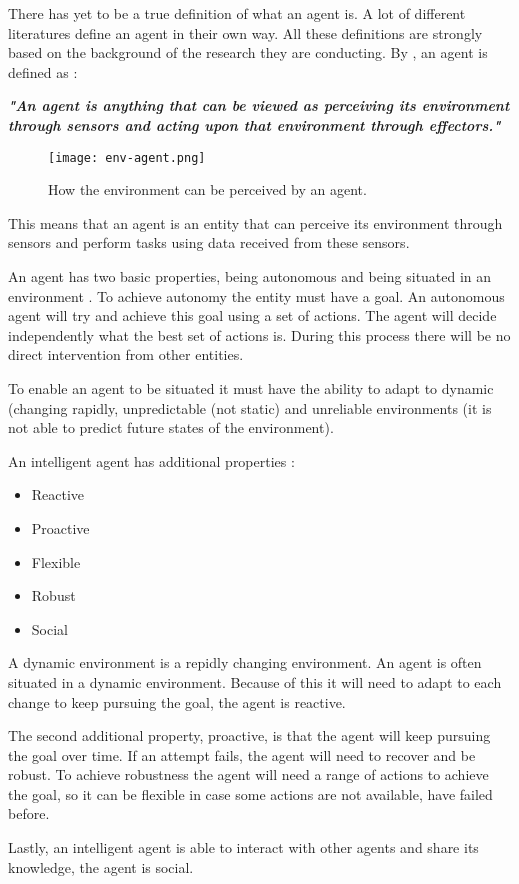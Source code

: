 
There has yet to be a true definition of what an agent is. A lot of different literatures define an agent in their own way.
All these definitions are strongly based on the background of the research they are conducting. By \citet{AI:agent}, an agent is defined as :

\begin{center}
    \textit{\textbf{"An agent is anything that can be viewed as perceiving its environment through sensors and acting upon that environment through effectors."}}
\end{center}


\begin{figure}[ht]
   \centering
   \texttt{[image: env-agent.png]}
   \caption[Agent]{How the environment can be perceived by an agent\footnotemark.}
\end{figure}

This means that an agent is an entity that can perceive its environment through sensors and 
perform tasks using data received from these sensors. 

An agent has two basic properties, being autonomous and being situated in an environment \cite{AI:guide}. 
To achieve autonomy the entity must have a goal. An autonomous agent will try and achieve this goal using a set of actions. 
The agent will decide independently what the best set of actions is. During this process there will be no direct intervention from other entities.

To enable an agent to be situated it must have the ability to adapt to dynamic (changing rapidly, unpredictable (not static) 
and unreliable environments (it is not able to predict future states of the environment).

An intelligent agent has additional properties :

\begin{itemize}
   \item Reactive
   \item Proactive
   \item Flexible
   \item Robust
   \item Social
\end{itemize}

A dynamic environment is a repidly changing environment. An agent is often situated in a dynamic environment.
Because of this it will need to adapt to each change to keep pursuing the goal, the agent is reactive. 

The second additional property, proactive, is that the agent will keep pursuing the goal over time. 
If an attempt fails, the agent will need to recover and be robust. 
To achieve robustness the agent will need a range of actions to achieve 
the goal, so it can be flexible in case some actions are not available, have failed before. 

Lastly, an intelligent agent is able to interact with other agents and share its knowledge, the agent is social.